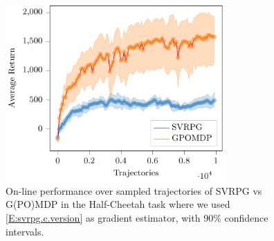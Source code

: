 \begin{figure}[h]
	\begin{minipage}[h]{1\textwidth}
		\centering
		\includegraphics[width=0.75\textwidth]{Images/Experiments/half_cheetah_GPOMDP_vs_NonSelf_SVRPG_C.pdf}
		\vspace{-0.1in}
		\caption{On-line performance over sampled trajectories of \acs{SVRPG} vs G(PO)MDP in the Half-Cheetah task where we used \ref{E:svrpg.c.version} as gradient estimator, with 90\% confidence intervals.}
		\label{fig:hcfour}
	\end{minipage}
	\vspace{-0.15in}
\end{figure}

